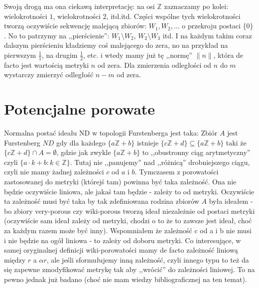 \documentclass[12pt]{amsart}
\begin{document}
Swoją drogą ma ona ciekawą interpretację:
na osi $\mathbb{Z}$ zaznaczamy po kolei: wielokrotności $1$, wielokrotności $2$, itd.itd.
Części wspólne tych wielokrotności tworzą oczywiście sekwencję malejącą 
zbiorów: $W_1, W_2, \ldots$ o przekroju postaci $\{0\}$. 
No to patrzymy na ,,pierścienie'': $W_1 \setminus W_2$, $W_2 \setminus W_3$ itd.
I na każdym takim coraz dalszym pierścieniu kładziemy coś malejącego do zera,
no na przykład na pierwszym $\frac{1}{1}$, na drugim $\frac{1}{2}$, etc.
i wtedy mamy już tę ,,normę'' $\|n\|$, która de facto jest wartością metryki $n$ od zera. 
Dla zmierzenia odległości od $n$ do $m$ wystarczy zmierzyć odległość $n-m$ od zera.

\section{Potencjalne porowate}

Normalna postać ideału ND w topologii Furstenberga jest taka: Zbiór $A$ jest 
Furstenberg $ND$ gdy dla każdego 
$\{a\mathbb{Z} + b\}$ istnieje $\{c\mathbb{Z} + d\} \subseteq \{a\mathbb{Z} + b\}$
taki że $\{c\mathbb{Z} + d\} \cap A = \emptyset$,
gdzie jak zwykle $\{a\mathbb{Z} + b\}$ to ,,obustronny ciąg arytmetyczny'' czyli
$\{a \cdot k + b\colon k \in \mathbb{Z}\}$. 
Tutaj nie ,,panujemy'' nad ,,różnicą'' drobniejszego ciągu, czyli nie
mamy żadnej zależności $c$ od $a$ i $b$. Tymczasem z porowatości zastosowanej
do metryki (którejś tam) powinna być taka zależność. Ona nie będzie
oczywiście liniowa, ale jakaś tam będzie - zależy to od metryki.
Oczywiście ta zależność musi być taka by tak zdefiniowana rodzina zbiorów
$A$ była ideałem - bo zbiory very-porous czy wiki-porous tworzą ideał niezależnie
od postaci metryki (oczywiście sam ideał zależy od metryki, chodzi o to że to
zawsze jest ideał, choć za każdym razem może być inny).
Wspomniałem że zależność c od a i b nie musi i nie będzie na ogół liniowa - to 
zależy od doboru metryki. Co interesujące, w samej oryginalnej definicji wiki-porowatości
mamy de facto zależność liniową między $r$ a $\alpha r$, ale jeśli sformułujemy inną
zależność, czyli innego typu to też da się zapewne zmodyfikować metrykę tak aby
,,wrócić'' do zależności liniowej. To na pewno jednak już badano (choć nie mam 
wiedzy bibliograficznej na ten temat).
\end{document}
